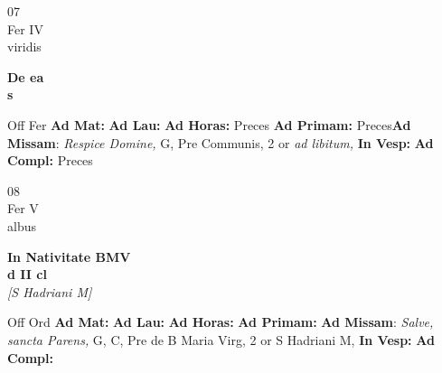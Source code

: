 \documentclass[10pt, openany]{book}
\begin{document}
    \begin{center}
        \begin{minipage}{3.5in}
            \vspace{2em}
            \begin{minipage}{0.5in}
                {\Huge 07} \\
                {\normalsize Fer IV} \\
                {\normalsize viridis}
            \end{minipage}
            \begin{minipage}{3.0in}
                \textbf{ \large De ea \\
                \textnormal{\normalsize s}} \\ 
            \end{minipage}
            \begin{justify}Off Fer
                \textbf{Ad Mat: }
                \textbf{Ad Lau: }
                \textbf{Ad Horas: }Preces
                \textbf{Ad Primam: }Preces\textbf{Ad Missam}: \textit{Respice Domine,} G, Pre Communis, 2 or \textit{ad libitum,}  
                \textbf{In Vesp: }
                \textbf{Ad Compl: }Preces
            \end{justify}
        \end{minipage}
    \end{center}

    \begin{center}
        \begin{minipage}{3.5in}
            \vspace{2em}
            \begin{minipage}{0.5in}
                {\Huge 08} \\
                {\normalsize Fer V} \\
                {\normalsize albus}
            \end{minipage}
            \begin{minipage}{3.0in}
                \textbf{ \large In Nativitate BMV \\
                \textnormal{\normalsize d II cl}} \\ \textit{[S Hadriani M]} \\ 
            \end{minipage}
            \begin{justify}Off Ord
                \textbf{Ad Mat: }
                \textbf{Ad Lau: }
                \textbf{Ad Horas: }
                \textbf{Ad Primam: }\textbf{Ad Missam}: \textit{Salve, sancta Parens,} G, C, Pre de B Maria Virg, 2 or S Hadriani M,  
                \textbf{In Vesp: }
                \textbf{Ad Compl: }
            \end{justify}
        \end{minipage}
    \end{center}
\end{document}
